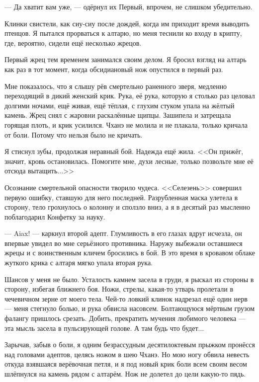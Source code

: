 --- Да хватит вам уже, --- одёрнул их Первый, впрочем, не слишком убедительно.

Клинки свистели, как сиу-сиу после дождей, когда им приходит время выводить птенцов.
Я пытался прорваться к алтарю, но меня теснили ко входу в крипту, где, вероятно, сидели ещё несколько жрецов.

Первый жрец тем временем занимался своим делом.
Я бросил взгляд на алтарь как раз в тот момент, когда обсидиановый нож опустился в первый раз.

Мне показалось, что я слышу рёв смертельно раненного зверя, медленно переходящий в дикий женский крик.
Рука, её рука, которую я столько раз целовал долгими ночами, ещё живая, ещё тёплая, с глухим стуком упала на жёлтый камень.
Жрец снял с жаровни раскалённые щипцы.
Зашипела и затрещала горящая плоть, и крик усилился.
Чханэ не молила и не плакала, только кричала от боли.
Потому что нельзя было не кричать.

Я стиснул зубы, продолжая неравный бой.
Надежда ещё жила.
<<Он прижёг, значит, кровь остановилась.
Помогите мне, духи лесные, только позвольте мне её отсюда вытащить...>>

Осознание смертельной опасности творило чудеса.
<<Селезень>> совершил первую ошибку, ставшую для него последней.
Разрубленная маска улетела в сторону, тело грохнулось о колонну и сползло вниз, а я в десятый раз мысленно поблагодарил Конфетку за науку.

--- Aiax\FM! --- каркнул второй адепт.
Глумливость в его глазах вдруг исчезла, он впервые увидел во мне серьёзного противника.
Наружу выбежали оставшиеся жрецы и с воинственным кличем бросились в бой.
В это время в кровавом облаке жуткого крика с алтаря мягко упала вторая рука.

Шансов у меня не было.
Усталость камнем засела в груди, я рыскал из стороны в сторону, избегая ближнего боя.
Ножи, стрелы, какая-то утварь пролетали в чечевичном зерне от моего тела.
Чей-то ловкий клинок надрезал ещё один нерв --- меня стегнуло болью, и рука обвисла насовсем.
Болтающуюся мёртвым грузом фалангу пришлось срезать.
Добить, прекратить мучения любимого человека --- эта мысль засела в пульсирующей голове.
А там будь что будет...

Зарычав, забыв о боли, я одним безрассудным десятилоктевым прыжком пронёсся над головами адептов, целясь ножом в шею Чханэ.
Но мою ногу обвила невесть откуда взявшаяся верёвочная петля, и я под новый крик боли всем своим весом шлёпнулся на камень рядом с алтарём.
Нож не долетел до цели какую-то пядь.

